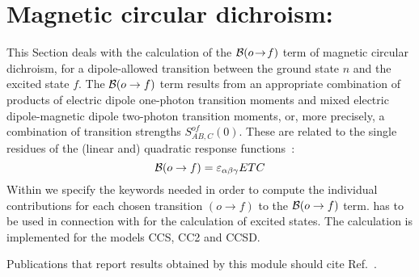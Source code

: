 
\section{Magnetic circular dichroism: }\label{sec:ccmcd}

This Section deals with the calculation of the 
${\cal{B}}(o\!\to\!f)$ term of magnetic circular dichroism,
for a dipole-allowed transition between the ground state $n$ and 
the excited state $f$.
The ${\cal{B}}(o\to f)$ term results from an appropriate combination of
products of electric dipole one-photon transition moments
and mixed electric dipole-magnetic dipole
two-photon transition moments,
or, more precisely, a combination of transition strengths
$S_{AB,C}^{of}(0)$.
These are related to the single residues of the (linear and) 
quadratic response functions~\cite{Coriani:MCDRSP,Coriani:MOACC,Coriani:PHD}:
\[
{\cal{B}}(o\to f) = \varepsilon_{\alpha\beta\gamma} ETC
\]
%
\noindent
Within  we specify the keywords needed in order
to compute the individual 
contributions for each chosen transition $(o\to f)$ to the
${\cal{B}}(o\to f)$ term.  has to be used in 
connection with  for the calculation of 
excited states.
The calculation is implemented for the models CCS, CC2 and CCSD.

\noindent Publications that report results obtained by this module
should cite Ref.\ \cite{Coriani:MOACC}.


